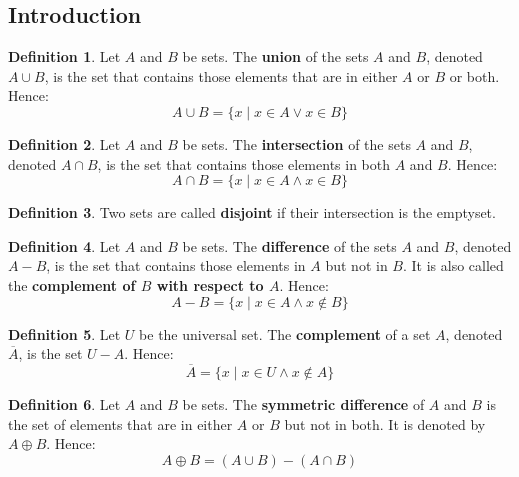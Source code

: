 \documentclass[article, 12pt]{article}
\theoremstyle{definition}
\newtheorem{definition}{Definition}[subsection]
\newcommand{\unite}{\cup}
\newcommand{\inter}{\cap}
\newcommand{\xor}{\oplus} %
\begin{document}
    \subsection{Introduction}
    \begin{definition}
        Let $A$ and $B$ be sets. The \textbf{union} of the sets $A$ and $B$, denoted $A \unite B$, is the set that contains those elements that are in either $A$ or $B$ or both. Hence:
        \begin{equation*}
            A \unite B = \{x \mid x \in A \lor x \in B\}
        \end{equation*}
    \end{definition}
    \begin{definition}
        Let $A$ and $B$ be sets. The \textbf{intersection} of the sets $A$ and $B$, denoted $A \inter B$, is the set that contains those elements in both $A$ and $B$. Hence:
        \begin{equation*}
            A \inter B = \{x \mid x \in A \land x \in B\}
        \end{equation*}
    \end{definition}
    \begin{definition}
        Two sets are called \textbf{disjoint} if their intersection is the emptyset.
    \end{definition}
    \begin{definition}
        Let $A$ and $B$ be sets. The \textbf{difference} of the sets $A$ and $B$, denoted $A - B$, is the set that contains those elements in $A$ but not in $B$. It is also called the \textbf{complement of $B$ with respect to $A$}. Hence:
        \begin{equation*}
            A - B = \{x \mid x \in A \land x \not\in B\}
        \end{equation*}
    \end{definition}
    \begin{definition}
        Let $U$ be the universal set. The \textbf{complement} of a set $A$, denoted $\overline{A}$, is the set $U - A$. Hence:
        \begin{equation*}
            \overline{A} = \{x \mid x \in U \land x \not\in A\}
        \end{equation*}
    \end{definition}
    \begin{definition}
        Let $A$ and $B$ be sets. The \textbf{symmetric difference} of $A$ and $B$ is the set of elements that are in either $A$ or $B$ but not in both. It is denoted by $A \xor B$. Hence:
        \begin{equation*}
            A \xor B = (A \unite B) - (A \inter B)
        \end{equation*} 
    \end{definition}
\end{document}
